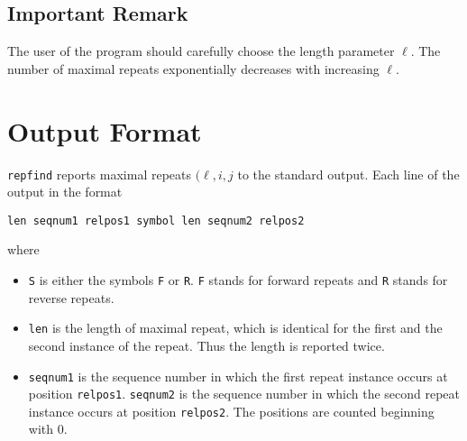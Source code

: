 \documentclass[12pt]{article}
\newcommand{\Repfind}[0]{\texttt{\small repfind}\xspace}
\begin{document}
\begin{Justshowoptions}







\end{Justshowoptions}

\subsection*{Important Remark} 
The user of the program should carefully choose the length parameter \(\ell\).
The number of maximal repeats exponentially decreases with increasing
\(\ell\).

\section{Output Format}\label{Output}
\Repfind reports maximal repeats \((\ell,i,j\) to the standard output.
Each line of the output in the format

\begin{verbatim}
len seqnum1 relpos1 symbol len seqnum2 relpos2
\end{verbatim}

where
\begin{itemize}
\item
\texttt{S} is either the symbols \texttt{F} or \texttt{R}.
\texttt{F} stands for forward repeats and \texttt{R} stands for
reverse repeats.
\item
\texttt{len} is the length of maximal repeat, which is identical for
the first and the second instance of the repeat. Thus the length is
reported twice.
\item
\texttt{seqnum1} is the sequence number in which the first repeat instance
occurs  at position \texttt{relpos1}.
\texttt{seqnum2} is the sequence number in which the second repeat instance
occurs  at position \texttt{relpos2}. The positions are counted beginning with
0.
\end{itemize}
\end{document}
